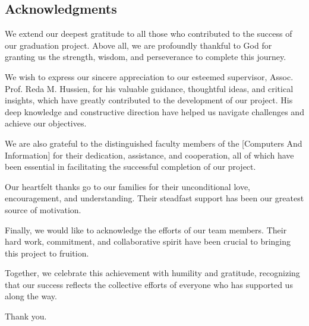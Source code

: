 \thispagestyle{fancy}
\fancyhf{}
\renewcommand{\headrulewidth}{0pt}
\fancyfoot[C]{\thepage}
\vspace*{\fill}
    \begin{center}
        \section*{Acknowledgments} %
    \end{center}

We extend our deepest gratitude to all those who contributed to the success of our graduation project. Above all, we are profoundly thankful to God for granting us the strength, wisdom, and perseverance to complete this journey.

We wish to express our sincere appreciation to our esteemed supervisor, Assoc. Prof. Reda M. Hussien, for his valuable guidance, thoughtful ideas, and critical insights, which have greatly contributed to the development of our project. His deep knowledge and constructive direction have helped us navigate challenges and achieve our objectives.

We are also grateful to the distinguished faculty members of the [Computers And Information] for their dedication, assistance, and cooperation, all of which have been essential in facilitating the successful completion of our project.

Our heartfelt thanks go to our families for their unconditional love, encouragement, and understanding. Their steadfast support has been our greatest source of motivation.

Finally, we would like to acknowledge the efforts of our team members. Their hard work, commitment, and collaborative spirit have been crucial to bringing this project to fruition.

Together, we celebrate this achievement with humility and gratitude, recognizing that our success reflects the collective efforts of everyone who has supported us along the way.

Thank you.
    \lipsum[1]
\vspace*{\fill}

